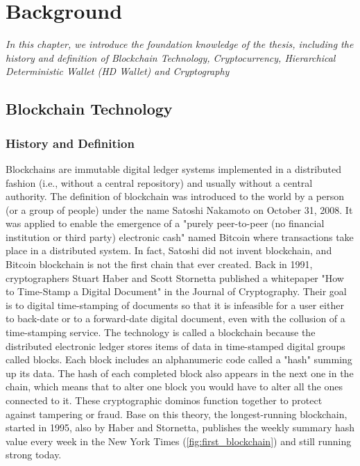 \chapter{Background} \label{chap:Background}

\label{chap:background}
	\textit{In this chapter, we introduce the foundation knowledge of the thesis, including the history and definition of Blockchain Technology, Cryptocurrency, 
	Hierarchical Deterministic Wallet (HD Wallet) and Cryptography}
\minitoc

\section{Blockchain Technology}

\subsection{History and Definition}

Blockchains are immutable digital ledger systems implemented in a distributed fashion (i.e., without a central repository) and usually without a central authority.
The definition of blockchain was introduced to the world by a person (or a group of people) under the name Satoshi Nakamoto on October 31, 2008. 
It was applied to enable the emergence of a "purely peer-to-peer (no financial institution or third party) electronic cash" named Bitcoin where transactions take place in a distributed system.
In fact, Satoshi did not invent blockchain, and Bitcoin blockchain is not the first chain that ever created. 
Back in 1991, cryptographers Stuart Haber and Scott Stornetta published a whitepaper "How to Time-Stamp a Digital Document" in the Journal of Cryptography. 
Their goal is to digital time-stamping of documents so that it is infeasible for a user either to back-date or to a forward-date digital document, even with the collusion of a time-stamping service. 
The technology is called a blockchain because the distributed electronic ledger stores items of data in time-stamped digital groups called blocks. Each block includes an alphanumeric code called a "hash" summing up its data. The hash of each completed block also appears in the next one in the chain, which means that to alter one block you would have to alter all the ones connected to it. These cryptographic dominos function together to protect against tampering or fraud.
Base on this theory, the longest-running blockchain, started in 1995, also by Haber and Stornetta, publishes the weekly summary hash value every week in the New York Times (\autoref{fig:first_blockchain}) and still running strong today. 

